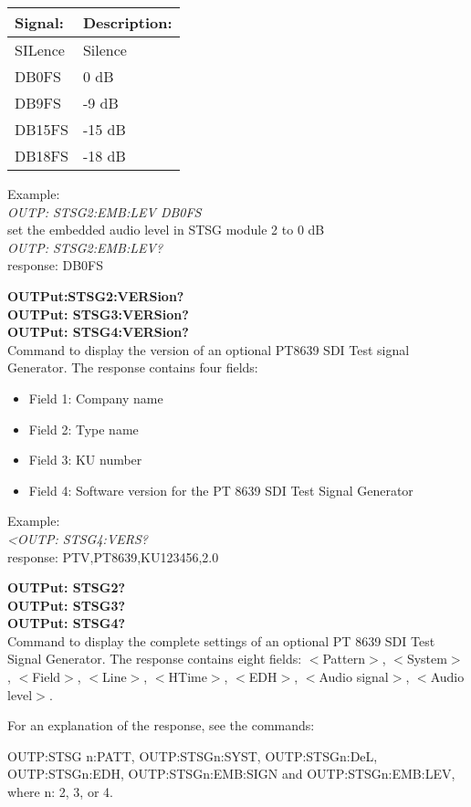 \begin{tabular}{|l|l|}
\hline
\textbf{Signal:} & \textbf{Description:} \\ \hline
SILence	& Silence \\ \hline
DB0FS		& 0 dB\\ \hline
DB9FS		& -9 dB\\ \hline
DB15FS	& -15 dB\\ \hline
DB18FS	& -18 dB\\ \hline
\end{tabular}

Example:\\
\textit{OUTP: STSG2:EMB:LEV DB0FS}\\
set the embedded audio level in STSG module 2 to 0 dB\\
\textit{OUTP: STSG2:EMB:LEV?}\\
response: DB0FS

\textbf{OUTPut:STSG2:VERSion?}\\
\textbf{OUTPut: STSG3:VERSion?}\\
\textbf{OUTPut: STSG4:VERSion?}\\
Command to display the version of an optional PT8639 SDI Test signal Generator. The response contains four fields:
\begin{itemize}
\item Field 1: Company name
\item Field 2: Type name
\item Field 3: KU number
\item Field 4: Software version for the PT 8639 SDI Test Signal Generator
\end{itemize}

Example:\\
\textit{<OUTP: STSG4:VERS?}\\
response: PTV,PT8639,KU123456,2.0

\textbf{OUTPut: STSG2?}\\
\textbf{OUTPut: STSG3?}\\
\textbf{OUTPut: STSG4?}\\
Command to display the complete settings of an optional PT 8639 SDI Test Signal Generator. The response contains eight fields:
$<$Pattern$>$, $<$System$>$, $<$Field$>$, $<$Line$>$, $<$HTime$>$, $<$EDH$>$, $<$Audio signal$>$, $<$Audio level$>$. 

For an explanation of the response, see the commands: 

OUTP:STSG n:PATT, OUTP:STSGn:SYST, OUTP:STSGn:DeL, OUTP:STSGn:EDH, OUTP:STSGn:EMB:SIGN and
OUTP:STSGn:EMB:LEV, where n: 2, 3, or 4.

